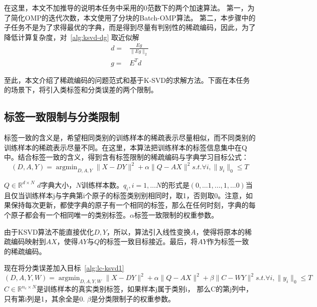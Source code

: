     在这里，本文不加推导的说明本任务中采用的0范数下的两个加速算法。
    第一，为了简化OMP的迭代次数，本文使用了分块的Batch-OMP算法\cite{rubinstein2008efficient}。
    第二，本步骤中的子任务不是为了求得最优的字典，而是得到尽量有判别性的稀疏编码，因此，为了降低计算复杂度，对~\ref{alg:ksvd-dg} 取近似解
    \begin{equation}
    \begin{split}
    d = & \frac{Eg}{\|Eg\|_2} \\
    g = & E^T d
    \end{split}
    \end{equation}

    至此，本文介绍了稀疏编码的问题范式和基于K-SVD的求解方法。下面在本任务的场景下，将引入类标签和分类误差的两个限制。

    

    \subsection{标签一致限制与分类限制}
    \label{sec:ksvd-constraint}
    标签一致的含义是，希望相同类别的训练样本的稀疏表示尽量相似，而不同类别的训练样本的稀疏表示尽量不同。在这里，本算法把训练样本的标签信息集中在Q中。结合标签一致的含义，得到含有标签限制的稀疏编码与字典学习目标公式：
    \begin{equation}
    \label{alg:lc-ksvd1}
    (D, A, Y) = \mathop{\arg \min} _{D, A, Y} \|X - DY\| ^ 2 + \alpha\|Q - AX\|^2 s.t. \forall i, \|y_i\|_0 \le T
    \end{equation}

     $Q\in \mathbb{R}^{d \times N}$ $d$字典大小，$N$训练样本数。$q_i, i = 1, \dots N$的形式是$(0, \dots 1, \dots, 1, \dots 0)$当且仅当训练样本j与字典第i个原子的标签类别别相同时，取1，否则取0。注意，如果保持每次更新，都使字典的原子有一个相同的标签，那么在任何时刻，字典的每个原子都会有一个相同唯一的类别标签。$\alpha $标签一致限制的权重参数。

    由于KSVD算法不能直接优化$D, Y$，所以，算法引入线性变换$A$，使得将原本的稀疏编码映射到$AX$，使得$AY$与$Q$的标签一致目标接近。最后，将$AY$作为标签一致的稀疏编码。



    现在将分类误差加入目标~\ref{alg:lc-ksvd1}
    \begin{equation}
    \label{alg:lc-ksvd2}
    (D, A, Y, W) = \mathop{\arg \min} _{D, A, Y, W} \|X - DY\| ^ 2 + \alpha\|Q - AX\|^2 + \beta\|C - WY\|^2 s.t. \forall i, \|y_i\|_0 \le T
    \end{equation}
    $C\in \mathbb{R}^{n_c \times N}$是训练样本的真实类别标签，如果样本j属于类别i， 那么C的第j列中，只有第i列是1，其余全是0. $\beta$是分类限制子的权重参数。

